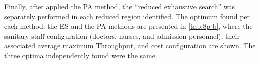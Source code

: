 \documentclass[11pt]{article} %
\begin{document}
Finally, after applied the PA method, the \textquotedblleft{}reduced exhaustive search\textquotedblright{}
was separately performed in each reduced region identified. The optimum
found per each method: the ES and the PA
methods are presented in \ref{tab:8p-b}, where the sanitary staff
configuration (doctors, nurses, and admission personnel), their associated
average maximum Throughput, and cost configuration are shown. The
three optima independently found were the same.

\end{document}
